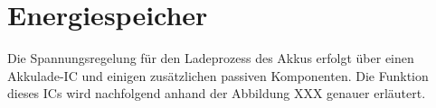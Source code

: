 \section{Energiespeicher}


Die Spannungsregelung für den Ladeprozess des Akkus erfolgt über einen Akkulade-IC und einigen zusätzlichen passiven Komponenten. Die Funktion dieses ICs wird nachfolgend anhand der Abbildung XXX genauer erläutert.